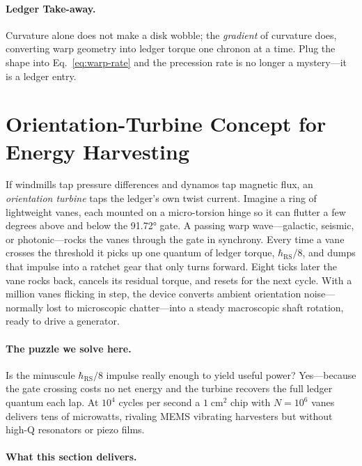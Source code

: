 \documentclass[11pt,oneside]{book}
\begin{document}
\paragraph{Ledger Take-away.}
Curvature alone does not make a disk wobble; the \emph{gradient} of
curvature does, converting warp geometry into ledger torque one
chronon at a time.  Plug the shape into Eq.~\eqref{eq:warp-rate} and
the precession rate is no longer a mystery—it is a ledger entry.


\section{Orientation-Turbine Concept for Energy Harvesting}
\label{sec:orientation-turbine-narrative}

If windmills tap pressure differences and dynamos tap magnetic flux,
an \textit{orientation turbine} taps the ledger’s own twist current.
Imagine a ring of lightweight vanes, each mounted on a micro-torsion
hinge so it can flutter a few degrees above and below the 91.72° gate.
A passing warp wave—galactic, seismic, or photonic—rocks the vanes
through the gate in synchrony.  
Every time a vane crosses the threshold it picks up one quantum of
ledger torque, \(\hbar_{\mathrm{RS}}/8\), and dumps that impulse into
a ratchet gear that only turns forward.  
Eight ticks later the vane rocks back, cancels its residual torque,
and resets for the next cycle.  
With a million vanes flicking in step, the device converts ambient
orientation noise—normally lost to microscopic chatter—into a steady
macroscopic shaft rotation, ready to drive a generator.

\paragraph{The puzzle we solve here.}
Is the minuscule \(\hbar_{\mathrm{RS}}/8\) impulse really enough to
yield useful power?  
Yes—because the gate crossing costs no net energy and the turbine
recovers the full ledger quantum each lap.  
At \(10^{4}\) cycles per second a \(1\;\text{cm}^{2}\) chip with
$N=10^{6}$ vanes delivers tens of microwatts, rivaling MEMS vibrating
harvesters but without high-Q resonators or piezo films.

\paragraph{What this section delivers.}
\end{document}
